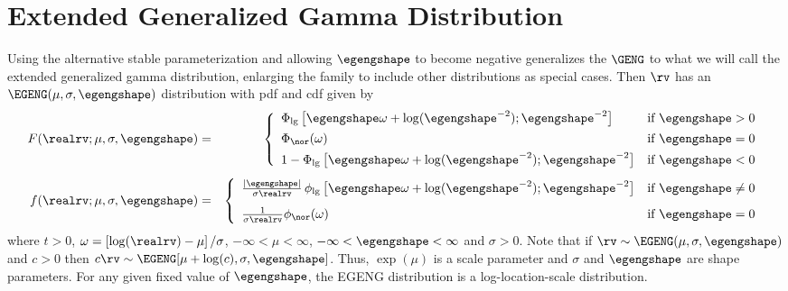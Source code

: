 \section{Extended Generalized Gamma Distribution}
\label{section:egeng.parameterization}
Using the alternative stable parameterization and allowing
$\egengshape$ to become negative generalizes the $\GENG$ to what we
will call the extended generalized gamma distribution, enlarging the
family to include other distributions as special cases. Then $\rv$ has
an $\EGENG(\mu,\sigma,\egengshape)$ distribution with pdf and cdf
given by
\begin{eqnarray}
\label{equation:egeng.cdf}
 F(\realrv;\mu,\sigma,\egengshape)&=&
\left \{
\begin{array}{ll}
\Phi_{\rm lg} \left [\egengshape \omega+
\log(\egengshape^{-2});\egengshape^{-2}
\right ]
& \mbox{if $\egengshape>0$}
\\[1ex]
\Phi_{\nor}(\omega)
& \mbox{if $\egengshape=0$}
\\[1ex]
1-\Phi_{\rm lg} \left [\egengshape \omega+
\log(\egengshape^{-2});\egengshape^{-2}
\right ]
& \mbox{if $\egengshape<0$}
\end{array}
\right. 
\\[1ex]
\label{equation:egeng.pdf}
 f(\realrv;\mu,\sigma,\egengshape)&=&
\left \{
\begin{array}{ll}
\frac{|\egengshape|}{\sigma \realrv} \, \phi_{\rm lg}
\left [
\egengshape \omega+
\log(\egengshape^{-2});\egengshape^{-2}
\right ] & \mbox{if $\egengshape \ne 0$}
\\[2ex]
\frac{1}
     {\sigma \realrv}
     \phi_{\nor}(\omega)
& \mbox{if $\egengshape=0$}
\end{array}
\right.
\end{eqnarray}
where $t>0$, $\omega=\left [\log(\realrv)-\mu \right ]/\sigma$,
$-\infty<\mu<\infty$, $-\infty<\egengshape<\infty$ and $\sigma>0$.
Note that if $\rv \sim \EGENG(\mu,\sigma,\egengshape)$ and $c >0$
then $c \rv \sim \EGENG[\mu + \log(c),\sigma,\egengshape]$.  Thus,
$\exp(\mu)$ is a scale parameter and $\sigma$ and $\egengshape$ are
shape parameters. For any given fixed value of $\egengshape$, the EGENG
distribution is a log-location-scale distribution.

